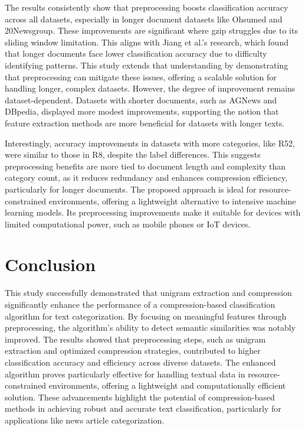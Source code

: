 \documentclass{article}
\begin{document}
The results consistently show that preprocessing boosts classification accuracy across all datasets, especially in longer document datasets like Ohsumed and 20Newsgroup. These improvements are significant where gzip struggles due to its sliding window limitation. This aligns with Jiang et al.'s research, which found that longer documents face lower classification accuracy due to difficulty identifying patterns. This study extends that understanding by demonstrating that preprocessing can mitigate these issues, offering a scalable solution for handling longer, complex datasets. However, the degree of improvement remains dataset-dependent. Datasets with shorter documents, such as AGNews and DBpedia, displayed more modest improvements, supporting the notion that feature extraction methods are more beneficial for datasets with longer texts.

Interestingly, accuracy improvements in datasets with more categories, like R52, were similar to those in R8, despite the label differences. This suggests preprocessing benefits are more tied to document length and complexity than category count, as it reduces redundancy and enhances compression efficiency, particularly for longer documents. The proposed approach is ideal for resource-constrained environments, offering a lightweight alternative to intensive machine learning models. Its preprocessing improvements make it suitable for devices with limited computational power, such as mobile phones or IoT devices.

\section{Conclusion}

This study successfully demonstrated that unigram extraction and compression significantly enhance the performance of a compression-based classification algorithm for text categorization. By focusing on meaningful features through preprocessing, the algorithm's ability to detect semantic similarities was notably improved. The results showed that preprocessing steps, such as unigram extraction and optimized compression strategies, contributed to higher classification accuracy and efficiency across diverse datasets. The enhanced algorithm proves particularly effective for handling textual data in resource-constrained environments, offering a lightweight and computationally efficient solution. These advancements highlight the potential of compression-based methods in achieving robust and accurate text classification, particularly for applications like news article categorization.
\end{document}
